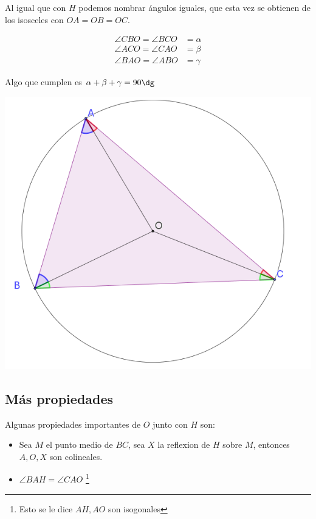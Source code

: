 \documentclass[11pt]{scrartcl}
\begin{document}
Al igual que con $H$ podemos nombrar \'angulos iguales, que esta vez se obtienen de los isosceles con $OA=OB=OC$.

\begin{align*}
    \angle CBO = \angle BCO &= \alpha \\
    \angle ACO= \angle CAO &= \beta \\
    \angle BAO = \angle ABO &= \gamma
\end{align*}

Algo que cumplen es $\alpha+\beta+\gamma=90\dg$

\begin{center}
        \includegraphics[scale=0.6]{PNAC12.png}
    \end{center}

\subsection{M\'as propiedades}

Algunas propiedades importantes de $O$ junto con $H$ son:

\begin{itemize}
    \item Sea $M$ el punto medio de $BC$, sea $X$ la reflexion de $H$ sobre $M$, entonces $A,O,X$ son colineales.
    \item $\angle BAH=\angle CAO$ \footnote{Esto se le dice $AH, AO$ son isogonales}
\end{itemize}
\end{document}
